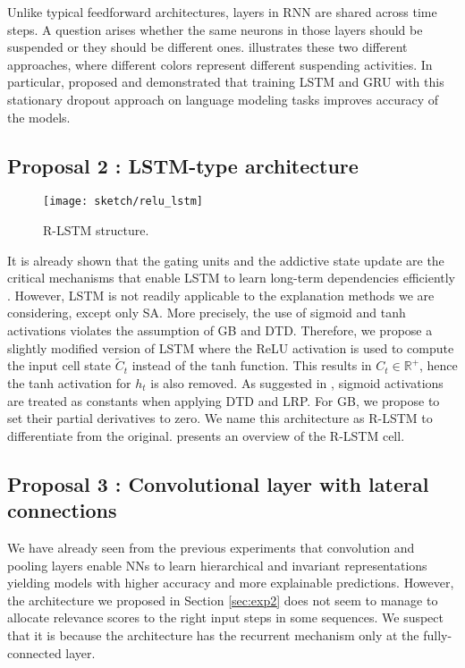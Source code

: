 Unlike typical feedforward architectures, layers in RNN are shared across time steps. A question arises whether the same neurons in those layers should be suspended or they should be different ones. \addfigure{\ref{fig:dropout_lstm}} illustrates these two different approaches, where different colors represent different suspending activities. In particular, \citet{GalTheoreticallyGroundedApplication2016} proposed and demonstrated that training LSTM and GRU with this stationary dropout approach on language modeling tasks improves accuracy of the models.


\subsection{Proposal 2 : LSTM-type architecture}
\begin{figure}[!htb]
\centering
\texttt{[image: sketch/relu\_lstm]}
\caption{R-LSTM structure.} 

\label{fig:relu_lstm} 
\end{figure}

It is already shown that the gating units and the addictive state update are the critical mechanisms that enable LSTM to learn long-term dependencies efficiently \citep{GreffLSTMsearchspace2017, JozefowiczEmpiricalExplorationRecurrent2015}. However, LSTM is not readily applicable to the explanation methods we are considering, except only SA. More precisely, the use of sigmoid and tanh activations violates the assumption of GB and DTD. Therefore, we propose a slightly modified version of LSTM where the ReLU activation is used to compute the  input cell state $\widetilde{C}_t$ instead of the tanh function. This results in $C_t \in \mathbb{R}^+$, hence the tanh activation for $h_t$  is also removed.  As suggested in \citep{ArrasExplainingRecurrentNeural2017},  sigmoid activations are treated as constants when applying DTD and LRP. For GB, we propose to set their partial derivatives to zero. We name this architecture as R-LSTM to differentiate from the original.  \addfigure{\ref{fig:relu_lstm}} presents an overview of the R-LSTM cell.


\subsection{Proposal 3 : Convolutional layer with lateral connections}
We have already seen from the previous experiments that convolution and pooling layers enable NNs to learn hierarchical and invariant representations yielding models with higher accuracy and more explainable predictions. However, the  architecture we proposed in Section \ref{sec:exp2} does not seem to manage to allocate relevance scores to the right input steps in some sequences. We suspect that it is because the architecture has the recurrent mechanism only at the fully-connected layer.


